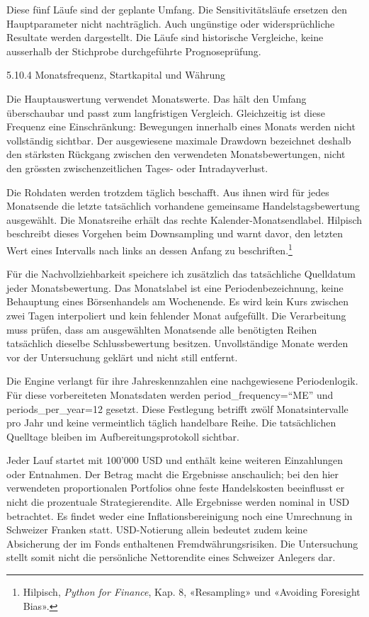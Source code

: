 \documentclass[
  ngerman,
  a4paper,
  DIV=11,
  oneside]{scrreprt}
\begin{document}
Diese fünf Läufe sind der geplante Umfang. Die Sensitivitätsläufe
ersetzen den Hauptparameter nicht nachträglich. Auch ungünstige oder
widersprüchliche Resultate werden dargestellt. Die Läufe sind
historische Vergleiche, keine ausserhalb der Stichprobe durchgeführte
Prognoseprüfung.

5.10.4 Monatsfrequenz, Startkapital und Währung

Die Hauptauswertung verwendet Monatswerte. Das hält den Umfang
überschaubar und passt zum langfristigen Vergleich. Gleichzeitig ist
diese Frequenz eine Einschränkung: Bewegungen innerhalb eines Monats
werden nicht vollständig sichtbar. Der ausgewiesene maximale Drawdown
bezeichnet deshalb den stärksten Rückgang zwischen den verwendeten
Monatsbewertungen, nicht den grössten zwischenzeitlichen Tages- oder
Intradayverlust.

Die Rohdaten werden trotzdem täglich beschafft. Aus ihnen wird für jedes
Monatsende die letzte tatsächlich vorhandene gemeinsame
Handelstagsbewertung ausgewählt. Die Monatsreihe erhält das rechte
Kalender-Monatsendlabel. Hilpisch beschreibt dieses Vorgehen beim
Downsampling und warnt davor, den letzten Wert eines Intervalls nach
links an dessen Anfang zu beschriften.\footnote{Hilpisch, \emph{Python
  for Finance}, Kap. 8, «Resampling» und «Avoiding Foresight Bias».}

Für die Nachvollziehbarkeit speichere ich zusätzlich das tatsächliche
Quelldatum jeder Monatsbewertung. Das Monatslabel ist eine
Periodenbezeichnung, keine Behauptung eines Börsenhandels am Wochenende.
Es wird kein Kurs zwischen zwei Tagen interpoliert und kein fehlender
Monat aufgefüllt. Die Verarbeitung muss prüfen, dass am ausgewählten
Monatsende alle benötigten Reihen tatsächlich dieselbe Schlussbewertung
besitzen. Unvollständige Monate werden vor der Untersuchung geklärt und
nicht still entfernt.

Die Engine verlangt für ihre Jahreskennzahlen eine nachgewiesene
Periodenlogik. Für diese vorbereiteten Monatsdaten werden
period\_frequency=``ME'' und periods\_per\_year=12 gesetzt. Diese
Festlegung betrifft zwölf Monatsintervalle pro Jahr und keine
vermeintlich täglich handelbare Reihe. Die tatsächlichen Quelltage
bleiben im Aufbereitungsprotokoll sichtbar.

Jeder Lauf startet mit 100'000 USD und enthält keine weiteren
Einzahlungen oder Entnahmen. Der Betrag macht die Ergebnisse
anschaulich; bei den hier verwendeten proportionalen Portfolios ohne
feste Handelskosten beeinflusst er nicht die prozentuale
Strategierendite. Alle Ergebnisse werden nominal in USD betrachtet. Es
findet weder eine Inflationsbereinigung noch eine Umrechnung in
Schweizer Franken statt. USD-Notierung allein bedeutet zudem keine
Absicherung der im Fonds enthaltenen Fremdwährungsrisiken. Die
Untersuchung stellt somit nicht die persönliche Nettorendite eines
Schweizer Anlegers dar.
\end{document}
